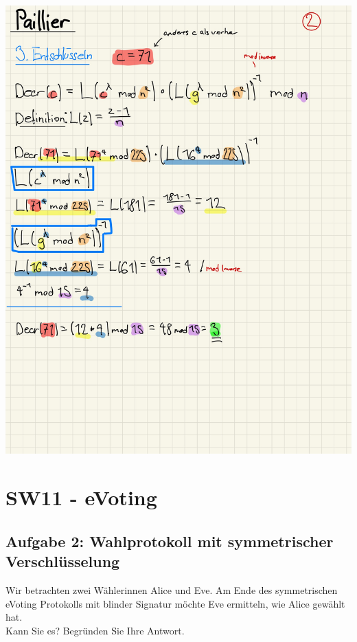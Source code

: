 \documentclass[11pt]{article}
\begin{document}
\begin{center}
	\includegraphics[scale=0.95]{img/pail2.jpg}\\
\end{center}

\newpage   

    \hypertarget{sw11---evoting}{%
\section{SW11 - eVoting}\label{sw11---evoting}}

    \hypertarget{aufgabe-2-wahlprotokoll-mit-symmetrischer-verschluxfcsselung}{%
\subsection{Aufgabe 2: Wahlprotokoll mit symmetrischer
Verschlüsselung}\label{aufgabe-2-wahlprotokoll-mit-symmetrischer-verschluxfcsselung}}

Wir betrachten zwei Wählerinnen Alice und Eve. Am Ende des symmetrischen
eVoting Protokolls mit blinder Signatur möchte Eve ermitteln, wie Alice
gewählt hat.\\
Kann Sie es? Begründen Sie Ihre Antwort.
\end{document}
